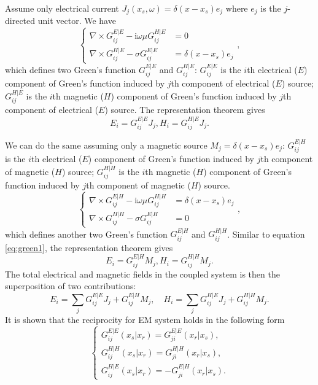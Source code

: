 \documentclass[a4paper,10pt]{article}
\begin{document}
Assume only electrical current $J_j(x_s,\omega)=\delta(x-x_s)e_j$ where $e_j$ is the $j$-directed unit vector. We have
\begin{equation}\label{eq:E|EH|E}
  \begin{cases}
    \nabla \times G_{ij}^{E|E} -\mathrm{i}\omega\mu  G_{ij}^{H|E} &= 0 \\
    \nabla \times G_{ij}^{H|E} -\sigma  G_{ij}^{E|E}  &=\delta(x-x_s)e_j
  \end{cases},
\end{equation}
which defines two Green's function $G_{ij}^{E|E}$ and $G_{ij}^{H|E}$: 
$G_{ij}^{E|E}$ is the $i$th electrical ($E$) component of Green's function induced 
by $j$th component of electrical ($E$) source; $G_{ij}^{H|E}$ is the $i$th 
magnetic ($H$) component of Green's function induced by $j$th component of 
electrical ($E$) source. The representation theorem gives
\begin{equation}\label{eq:green1}
  E_i =  G_{ij}^{E|E} J_j, H_i = G_{ij}^{H|E} J_j.
\end{equation}



We can do the same assuming only a magnetic source $M_j=\delta(x-x_s)e_j$: 
$G_{ij}^{E|H}$ is the $i$th electrical ($E$)  component of Green's function 
induced by $j$th component of magnetic ($H$) source; $G_{ij}^{H|H}$ is the 
$i$th magnetic ($H$) component of Green's function induced by $j$th component of 
magnetic ($H$) source.
\begin{equation}\label{eq:HH|E|H}
  \begin{cases}
    \nabla \times G_{ij}^{E|H} -\mathrm{i}\omega\mu  G_{ij}^{H|H} &= \delta(x-x_s)e_j \\
    \nabla \times G_{ij}^{H|H} -\sigma  G_{ij}^{E|H}  &=0
  \end{cases},
\end{equation}
which defines another two Green's function $G_{ij}^{E|H}$ and $G_{ij}^{H|H}$. Similar to equation \eqref{eq:green1}, the representation theorem gives
\begin{equation}
  E_i =  G_{ij}^{E|H} M_j, H_i = G_{ij}^{H|H} M_j.
\end{equation}
The total electrical  and magnetic fields in the coupled system is then the 
superposition of two contributions:
\begin{equation}
  E_i =\sum_j G_{ij}^{E|E} J_j + G_{ij}^{E|H} M_j, \quad 
  H_i =\sum_j G_{ij}^{H|E} J_j + G_{ij}^{H|H} M_j.
\end{equation}
It is shown that the reciprocity for EM system holds in the following form
\begin{equation}\label{eq:reciprocity}
  \begin{cases}
  G_{ij}^{E|E}(x_s|x_r) =  G_{ji}^{E|E}(x_r|x_s),\\
  G_{ij}^{H|H}(x_s|x_r) =  G_{ji}^{H|H}(x_r|x_s),\\
  G_{ij}^{H|E}(x_s|x_r) = - G_{ji}^{E|H}(x_r|x_s).
  \end{cases}
\end{equation}
\end{document}
